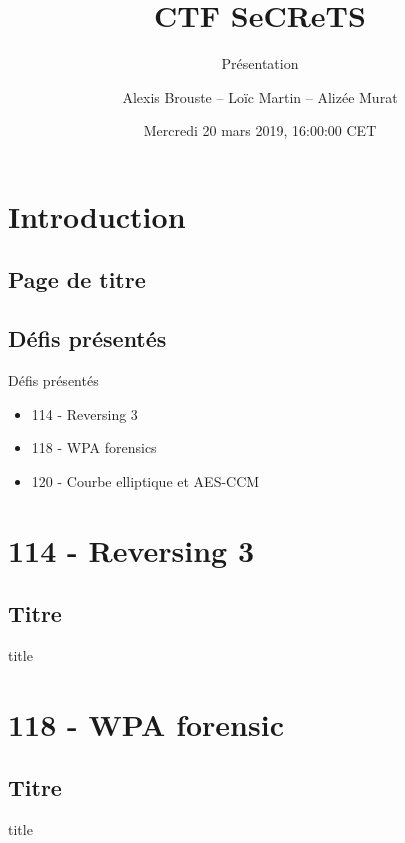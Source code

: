 \documentclass[10pt,sans,usenames,dvipsnames,french,compress]{beamer}
\title{CTF SeCReTS}
\subtitle{Présentation}
\author{Alexis Brouste -- Loïc Martin -- Alizée Murat}
\date{Mercredi 20 mars 2019, 16:00:00 CET}
\institute[UVSQ]{UVSQ}
\begin{document}
\section{Introduction}
\subsection{Page de titre}
\begin{frame}[plain]
	\titlepage
\end{frame}

\subsection{Défis présentés}
\begin{frame}{Défis présentés}
	\begin{itemize}
		\item 114 - Reversing 3
		\item 118 - WPA forensics
		\item 120 - Courbe elliptique et AES-CCM
	\end{itemize}
\end{frame}

\section{114 - Reversing 3}
\subsection{Titre}
\begin{frame}
	\begin{beamercolorbox}[sep=8pt,center]{title}
	\end{beamercolorbox}
\end{frame}

\section{118 - WPA forensic}
\subsection{Titre}
\begin{frame}
	\begin{beamercolorbox}[sep=8pt,center]{title}
	\end{beamercolorbox}
\end{frame}
\end{document}
